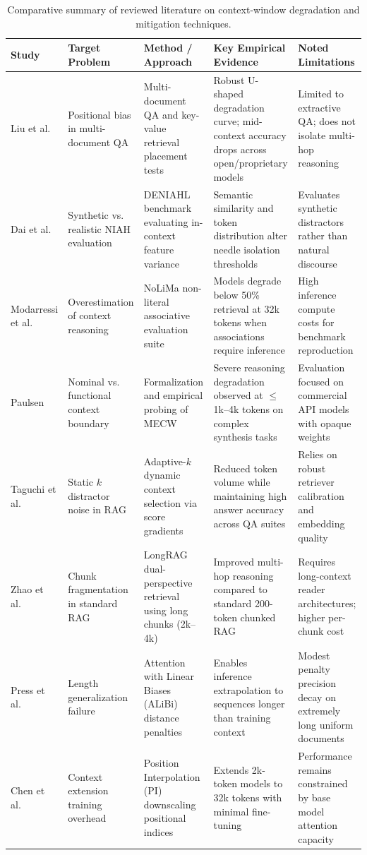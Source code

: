 \documentclass[manuscript]{acmart}
\begin{document}
\begin{table}[htbp]
\small
\centering
\caption{Comparative summary of reviewed literature on context-window degradation and mitigation techniques.}
\label{tab:reviewed_studies}
\begin{tabularx}{\textwidth}{l p{2.8cm} p{3.2cm} p{4.2cm} p{3.8cm}}
\toprule
\textbf{Study} & \textbf{Target Problem} & \textbf{Method / Approach} & \textbf{Key Empirical Evidence} & \textbf{Noted Limitations} \\
\midrule
Liu et al.~\cite{liu2024lost} & Positional bias in multi-document QA & Multi-document QA and key-value retrieval placement tests & Robust U-shaped degradation curve; mid-context accuracy drops across open/proprietary models & Limited to extractive QA; does not isolate multi-hop reasoning \\
\addlinespace
Dai et al.~\cite{dai2024deniahl} & Synthetic vs. realistic NIAH evaluation & DENIAHL benchmark evaluating in-context feature variance & Semantic similarity and token distribution alter needle isolation thresholds & Evaluates synthetic distractors rather than natural discourse \\
\addlinespace
Modarressi et al.~\cite{modarressi2025nolima} & Overestimation of context reasoning & NoLiMa non-literal associative evaluation suite & Models degrade below 50\% retrieval at 32k tokens when associations require inference & High inference compute costs for benchmark reproduction \\
\addlinespace
Paulsen~\cite{paulsen2025mecw} & Nominal vs. functional context boundary & Formalization and empirical probing of MECW & Severe reasoning degradation observed at $\le$1k--4k tokens on complex synthesis tasks & Evaluation focused on commercial API models with opaque weights \\
\addlinespace
Taguchi et al.~\cite{taguchi2025adaptivek} & Static $k$ distractor noise in RAG & Adaptive-$k$ dynamic context selection via score gradients & Reduced token volume while maintaining high answer accuracy across QA suites & Relies on robust retriever calibration and embedding quality \\
\addlinespace
Zhao et al.~\cite{zhao2024longrag} & Chunk fragmentation in standard RAG & LongRAG dual-perspective retrieval using long chunks (2k--4k) & Improved multi-hop reasoning compared to standard 200-token chunked RAG & Requires long-context reader architectures; higher per-chunk cost \\
\addlinespace
Press et al.~\cite{press2022alibi} & Length generalization failure & Attention with Linear Biases (ALiBi) distance penalties & Enables inference extrapolation to sequences longer than training context & Modest penalty precision decay on extremely long uniform documents \\
\addlinespace
Chen et al.~\cite{chen2023interpolation} & Context extension training overhead & Position Interpolation (PI) downscaling positional indices & Extends 2k-token models to 32k tokens with minimal fine-tuning & Performance remains constrained by base model attention capacity \\
\bottomrule
\end{tabularx}
\end{table}
\end{document}

